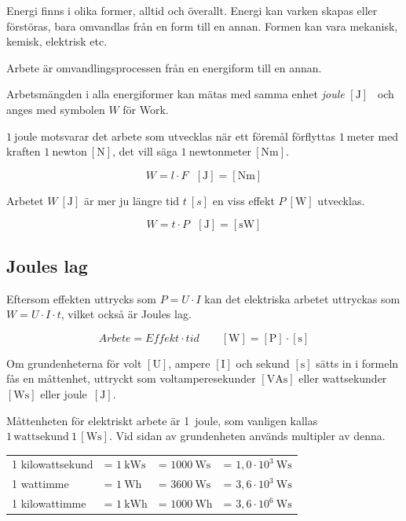 Energi finns i olika former, alltid och överallt.
Energi kan varken skapas eller förstöras, bara omvandlas från en form till en
annan.
Formen kan vara mekanisk, kemisk, elektrisk etc.

Arbete är omvandlingsprocessen från en energiform till en annan.

Arbetsmängden i alla energiformer kan mätas med samma enhet \emph{joule}
\(\mathrm{[J]}\)~\cite{SIbrochure8} och anges med symbolen \(W\) för Work.

\(1\ \mathrm{joule}\) motsvarar det arbete som utvecklas när ett föremål
förflyttas \(1\ \mathrm{meter}\) med kraften \(1\ \mathrm{newton\ [N]}\),
det vill säga \(1\ \mathrm{newtonmeter\ [Nm]}\).

\[W = l \cdot F \ \ \ \mathrm{[J] = [Nm]}\]

Arbetet \(W\ \mathrm{[J]}\) är mer ju längre tid \(t\ [s]\) en viss effekt
\(P\ \mathrm{[W]}\) utvecklas.

\[W = t \cdot P \ \ \ \mathrm{[J] = [sW]}\]

\subsection{Joules lag}
\label{joules_lag}


Eftersom effekten uttrycks som \(P = U \cdot I\) kan det elektriska arbetet
uttryckas som \(W = U \cdot I \cdot t\), vilket också är Joules lag.

\[\textit{Arbete} = \textit{Effekt} \cdot \textit{tid}\qquad \mathrm{[W]} = \mathrm{[P]} \cdot \mathrm{[s]}\]

Om grundenheterna för volt \(\mathrm{[U]}\), ampere \(\mathrm{[I]}\) och
sekund \(\mathrm{[s]}\) sätts in i formeln fås en måttenhet, uttryckt som
voltamperesekunder \(\mathrm{[VAs]}\) eller wattsekunder \(\mathrm{[Ws]}\)
eller joule\ \(\mathrm{[J]}\).

Måttenheten för elektriskt arbete är 1~joule, som vanligen
kallas \(1\,\mathrm{wattsekund}\ 1\,\mathrm{[Ws]}\).
Vid sidan av grundenheten används multipler av denna.

\begin{center}
\small
\noindent
\begin{tabular}{@{}l@{\,}l@{}l@{}l@{}}
   1 kilowattsekund & = $1\ \text{kWs}$ & = $1000\ \text{Ws}$ & = $1,0\cdot 10^3\ \text{Ws}$ \\
   1 wattimme       & = $1\ \text{Wh}$  & = $3600\ \text{Ws}$ & = $3,6\cdot 10^3\ \text{Ws}$ \\
   1 kilowattimme   & = $1\ \text{kWh}$ & = $1000\ \text{Wh}$ & = $3,6\cdot 10^6\ \text{Ws}$
\end{tabular}
\end{center}

